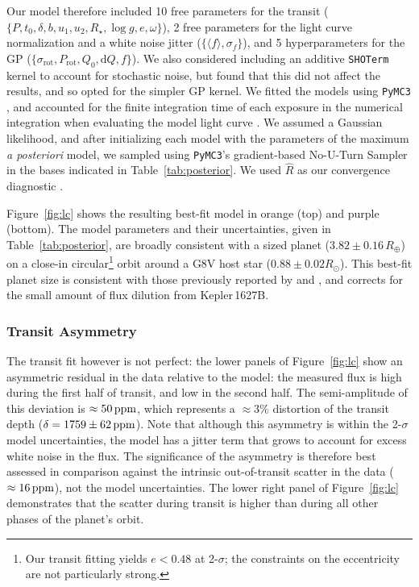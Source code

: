 \documentclass[12pt,modern,twocolumn,tighten]{aastex63}
\begin{document}
Our model therefore included 10 free parameters for the transit ($\{P,
t_0, \delta, b, u_1 ,u_2 ,R_\star, \log g, e, \omega \}$), 2 free
parameters for the light curve normalization and a white noise jitter
($\{\langle f \rangle, \sigma_f \}$), and 5 hyperparameters for the GP
($\{\sigma_{\mathrm{rot}}, P_{\mathrm{rot}}, Q_0, \mathrm{d}Q, f \}$).
We also considered including an additive \texttt{SHOTerm} kernel to
account for stochastic noise, but found that this did not affect the
results, and so opted for the simpler GP kernel.  We fitted the models
using \texttt{PyMC3} \citep{salvatier_2016_PyMC3,exoplanet:theano},
and accounted for the finite integration time of each exposure in the
numerical integration when evaluating the model light curve
\citep[see][]{kipping_binning_2010}.  We assumed a Gaussian
likelihood, and after initializing each model with the parameters of
the maximum {\it a posteriori} model, we sampled using
\texttt{PyMC3}'s gradient-based No-U-Turn Sampler
\citep{hoffman_no-u-turn_2014} in the bases indicated in
Table~\ref{tab:posterior}.  We used $\hat{R}$ as our convergence
diagnostic \citep{gelman_inference_1992}.

Figure~\ref{fig:lc} shows the resulting best-fit model in orange (top)
and purple (bottom).  The model parameters and their uncertainties,
given in Table~\ref{tab:posterior}, are broadly consistent with a
sized planet ($3.82\pm0.16\,R_\oplus$) on a close-in
circular\footnote{ Our transit fitting yields $e<0.48$ at 2-$\sigma$;
the constraints on the eccentricity are not particularly strong.}
orbit around a G8V host star ($0.88 \pm 0.02 R_\odot$).  This best-fit
planet size is consistent with those previously reported by
\citet{morton_false_2016} and \citet{berger_2018_radii}, and
corrects for the small amount of flux dilution from Kepler\,1627B.

\subsubsection{Transit Asymmetry}
\label{subsec:asymmetry}
The transit fit however is not perfect: the lower panels of
Figure~\ref{fig:lc} show an asymmetric residual in the data relative
to the model: the measured flux is high during the first half of
transit, and low in the second half.  The semi-amplitude of this
deviation is $\approx50\,{\rm ppm}$, which represents a $\approx 3\%$
distortion of the transit depth ($\delta=1759\pm62\,{\rm ppm}$).  Note that
although this asymmetry is within the 2-$\sigma$ model uncertainties, the
model has a jitter term that grows to account for excess
white noise in the flux.  The significance of the asymmetry is
therefore best assessed in comparison against the intrinsic
out-of-transit scatter in the data ($\approx16\,{\rm ppm}$), not the model uncertainties.  The
lower right panel of Figure~\ref{fig:lc} demonstrates that the scatter during
transit is higher than during all other phases of the planet's orbit.
\end{document}
